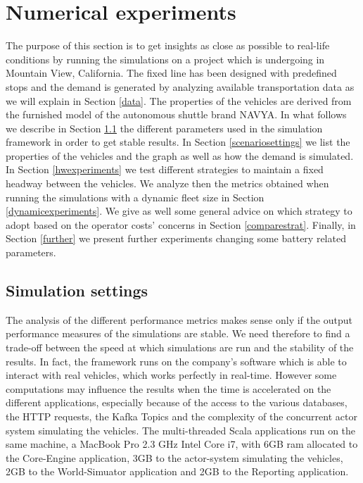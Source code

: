 \documentclass[12pt,a4paper]{article}
\begin{document}
\section{Numerical experiments}\label{experiments}
The purpose of this section is to get insights as close as possible to real-life conditions by running the simulations on a project which is undergoing in Mountain View, California. The fixed line has been designed with predefined stops and the demand is generated by analyzing available transportation data as we will explain in Section \ref{data}. The properties of the vehicles are derived from the furnished model of the autonomous shuttle brand NAVYA. In what follows we describe in Section \ref{settings} the different parameters used in the simulation framework in order to get stable results. In Section \ref{scenariosettings} we list the properties of the vehicles and the graph as well as how the demand is simulated. In Section \ref{hwexperiments} we test different strategies to maintain a fixed headway between the vehicles. We analyze then the metrics obtained when running the simulations with a dynamic fleet size in Section \ref{dynamicexperiments}. We give as well some general advice on which strategy to adopt based on the operator costs' concerns in Section \ref{comparestrat}. Finally, in Section \ref{further} we present further experiments changing some battery related parameters.

\subsection{Simulation settings}\label{settings}
The analysis of the different performance metrics makes sense only if the output performance measures of the simulations are stable. We need therefore to find a trade-off between the speed at which simulations are run and the stability of the results. In fact, the framework runs on the company's software which is able to interact with real vehicles, which works perfectly in real-time. However some computations may influence the results when the time is accelerated on the different applications, especially because of the access to the various databases, the HTTP requests, the Kafka Topics and the complexity of the concurrent actor system simulating the vehicles. The multi-threaded Scala applications run on the same machine, a MacBook Pro 2.3 GHz Intel Core i7, with 6GB ram allocated to the Core-Engine application, 3GB to the actor-system simulating the vehicles, 2GB to the World-Simuator application and 2GB to the Reporting application. 
\end{document}
